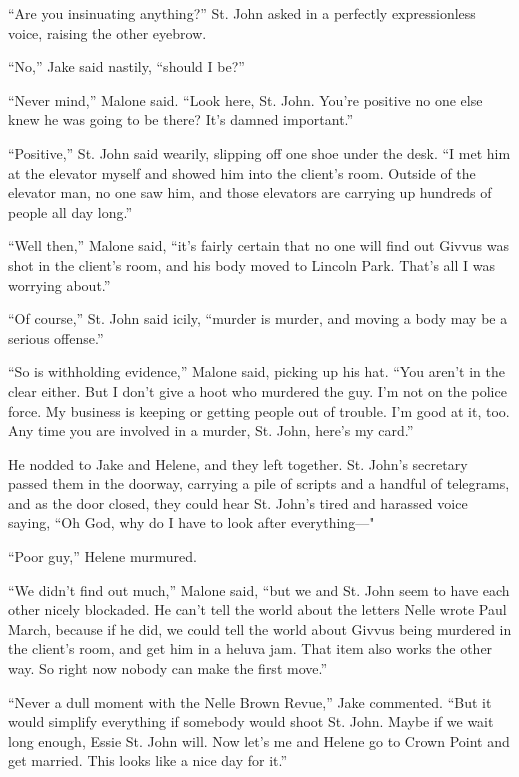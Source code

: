 \documentclass{novel}
\begin{document}
“Are you insinuating anything?” St. John asked in a perfectly expressionless voice, raising the other eyebrow.

“No,” Jake said nastily, “should I be?”

“Never mind,” Malone said. “Look here, St. John. You’re positive no one else knew he was going to be there? It’s damned important.”

“Positive,” St. John said wearily, slipping off one shoe under the desk. “I met him at the elevator myself and showed him into the client’s room. Outside of the elevator man, no one saw him, and those elevators are carrying up hundreds of people all day long.”

“Well then,” Malone said, “it’s fairly certain that no one will find out Givvus was shot in the client’s room, and his body moved to Lincoln Park. That’s all I was worrying about.”

“Of course,” St. John said icily, “murder is murder, and moving a body may be a serious offense.”

“So is withholding evidence,” Malone said, picking up his hat. “You aren’t in the clear either. But I don’t give a hoot who murdered the guy. I’m not on the police force. My business is keeping or getting people out of trouble. I’m good at it, too. Any time you are involved in a murder, St. John, here’s my card.”

He nodded to Jake and Helene, and they left together. St. John’s secretary passed them in the doorway, carrying a pile of scripts and a handful of telegrams, and as the door closed, they could hear St. John’s tired and harassed voice saying, “Oh God, why do I have to look after everything—"

“Poor guy,” Helene murmured.

“We didn’t find out much,” Malone said, “but we and St. John seem to have each other nicely blockaded. He can’t tell the world about the letters Nelle wrote Paul March, because if he did, we could tell the world about Givvus being murdered in the client’s room, and get him in a heluva jam. That item also works the other way. So right now nobody can make the first move.”

“Never a dull moment with the Nelle Brown Revue,” Jake commented. “But it would simplify everything if somebody would shoot St. John. Maybe if we wait long enough, Essie St. John will. Now let’s me and Helene go to Crown Point and get married. This looks like a nice day for it.”

\vspace{2\nbs}
\clearpage
\thispagestyle{empty}
\end{document}
